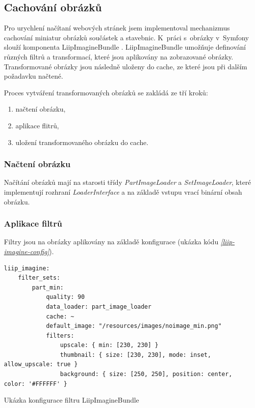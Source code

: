 \subsection{Cachování obrázků}
Pro urychlení načítaní webových stránek jsem implementoval mechanizmus cachování miniatur obrázků součástek a stavebnic. K~práci s~obrázky v~Symfony slouží komponenta LiipImagineBundle \autocite{liipimagine}. LiipImagineBundle umožňuje definování různých filtrů a transformací, které jsou aplikovány na zobrazované obrázky. Transformované obrázky jsou následně uloženy do cache, ze které jsou při dalším požadavku načtené.

Proces vytváření transformovaných obrázků se zakládá ze tří kroků:
\begin{enumerate}
    \item načtení obrázku,
    \item aplikace flitrů,
    \item uložení transformovaného obrázku do cache.
\end{enumerate}

\subsubsection*{Načtení obrázku}
Načítání obrázků mají na starosti třídy \textit{PartImageLoader} a \textit{SetImageLoader}, které implementují rozhraní \textit{LoaderInterface} a na základě vstupu vrací binární obsah obrázku. 






\subsubsection*{Aplikace filtrů}
Filtry jsou na obrázky aplikovány na základě konfigurace (ukázka kódu \emph{\ref{liip-imagine-config}}).  

\begin{listing}[htbp]
  \begin{verbatim}
liip_imagine:
    filter_sets:
        part_min:
            quality: 90
            data_loader: part_image_loader
            cache: ~
            default_image: "/resources/images/noimage_min.png"
            filters:
                upscale: { min: [230, 230] }
                thumbnail: { size: [230, 230], mode: inset, allow_upscale: true }
                background: { size: [250, 250], position: center, color: '#FFFFFF' }
  \end{verbatim}
  \caption{Ukázka konfigurace filtru LiipImagineBundle\label{liip-imagine-config}}
\end{listing}



